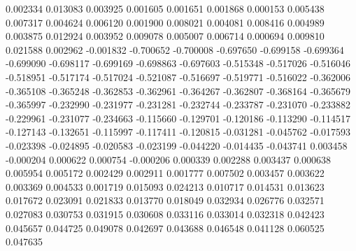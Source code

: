 0.002334
0.013083
0.003925
0.001605
0.001651
0.001868
0.000153
0.005438
0.007317
0.004624
0.006120
0.001900
0.008021
0.004081
0.008416
0.004989
0.003875
0.012924
0.003952
0.009078
0.005007
0.006714
0.000694
0.009810
0.021588
0.002962
-0.001832
-0.700652
-0.700008
-0.697650
-0.699158
-0.699364
-0.699090
-0.698117
-0.699169
-0.698863
-0.697603
-0.515348
-0.517026
-0.516046
-0.518951
-0.517174
-0.517024
-0.521087
-0.516697
-0.519771
-0.516022
-0.362006
-0.365108
-0.365248
-0.362853
-0.362961
-0.364267
-0.362807
-0.368164
-0.365679
-0.365997
-0.232990
-0.231977
-0.231281
-0.232744
-0.233787
-0.231070
-0.233882
-0.229961
-0.231077
-0.234663
-0.115660
-0.129701
-0.120186
-0.113290
-0.114517
-0.127143
-0.132651
-0.115997
-0.117411
-0.120815
-0.031281
-0.045762
-0.017593
-0.023398
-0.024895
-0.020583
-0.023199
-0.044220
-0.014435
-0.043741
0.003458
-0.000204
0.000622
0.000754
-0.000206
0.000339
0.002288
0.003437
0.000638
0.005954
0.005172
0.002429
0.002911
0.001777
0.007502
0.003457
0.003622
0.003369
0.004533
0.001719
0.015093
0.024213
0.010717
0.014531
0.013623
0.017672
0.023091
0.021833
0.013770
0.018049
0.032934
0.026776
0.032571
0.027083
0.030753
0.031915
0.030608
0.033116
0.033014
0.032318
0.042423
0.045657
0.044725
0.049078
0.042697
0.043688
0.046548
0.041128
0.060525
0.047635
